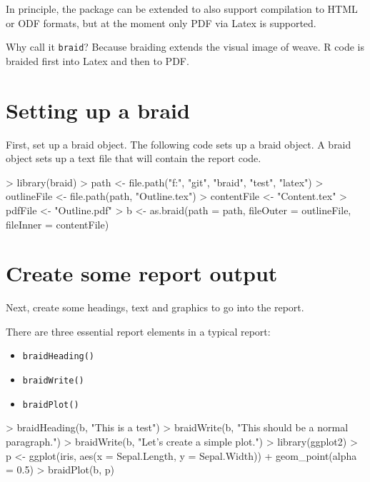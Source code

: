 \documentclass[a4paper]{article}
\newcommand{\braid}{{\tt braid}}
\newcommand{\code}[1]{{\tt #1}}
\begin{document}
In principle, the package can be extended to also support compilation to HTML or ODF formats, but at the moment only PDF via Latex is supported.

Why call it \braid{}?  Because braiding extends the visual image of weave. R code is braided first into Latex and then to PDF. 


\section{Setting up a braid}

First, set up a braid object.  The following code sets up a braid object.  A braid object sets up a text file that will contain the report code.

\begin{Schunk}
\begin{Sinput}
> library(braid)
> path <- file.path("f:", "git", "braid", "test", "latex")
> outlineFile <- file.path(path, "Outline.tex")
> contentFile <- "Content.tex"
> pdfFile <- "Outline.pdf"
> b <- as.braid(path = path, fileOuter = outlineFile, fileInner = contentFile)
\end{Sinput}
\end{Schunk}

\section{Create some report output}

Next, create some headings, text and graphics to go into the report.

There are three essential report elements in a typical report:

\begin{itemize}
	\item \code{braidHeading()}
	\item \code{braidWrite()}
	\item \code{braidPlot()}
\end{itemize}


\begin{Schunk}
\begin{Sinput}
> braidHeading(b, "This is a test")
> braidWrite(b, "This should be a normal paragraph.")
> braidWrite(b, "Let's create a simple plot.")
> library(ggplot2)
> p <- ggplot(iris, aes(x = Sepal.Length, y = Sepal.Width)) + geom_point(alpha = 0.5)
> braidPlot(b, p)
\end{Sinput}
\end{Schunk}
\end{document}
